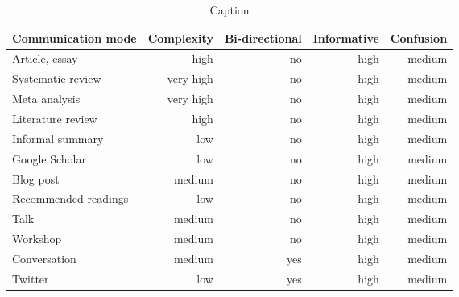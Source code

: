 \begin{table*}\centering
{}
\begin{tabular}{@{}lrrrr@{}}\toprule
Communication mode & Complexity & Bi-directional & Informative  & Confusion
\\\midrule
Article, essay      & high & no & high & medium  \\
Systematic review   & very high & no & high & medium\\
Meta analysis       & very high & no & high & medium\\
Literature review   & high & no & high & medium\\
Informal summary    & low & no & high & medium\\
Google Scholar      & low & no & high & medium\\
Blog post           & medium & no & high & medium\\
Recommended readings& low & no & high & medium\\
Talk                & medium & no & high & medium\\
Workshop            & medium    & no & high & medium\\
Conversation        & medium    & yes & high & medium\\
Twitter             & low       & yes & high & medium\\
\bottomrule
\end{tabular}
\caption{Caption}
\end{table*}